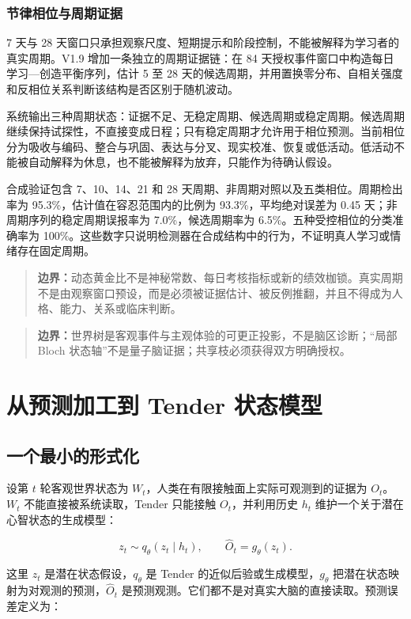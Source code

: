\documentclass[UTF8,a4paper,11pt]{ctexart}
\newcommand{\boundary}[1]{\begin{quote}\noindent\textbf{\color{TenderPink}边界：}#1\end{quote}}
\begin{document}
\subsubsection{节律相位与周期证据}

7 天与 28 天窗口只承担观察尺度、短期提示和阶段控制，不能被解释为学习者的真实周期。V1.9 增加一条独立的周期证据链：在 84 天授权事件窗口中构造每日学习—创造平衡序列，估计 5 至 28 天的候选周期，并用置换零分布、自相关强度和反相位关系判断该结构是否区别于随机波动。

系统输出三种周期状态：证据不足、无稳定周期、候选周期或稳定周期。候选周期继续保持试探性，不直接变成日程；只有稳定周期才允许用于相位预测。当前相位分为吸收与编码、整合与巩固、表达与分叉、现实校准、恢复或低活动。低活动不能被自动解释为休息，也不能被解释为放弃，只能作为待确认假设。

合成验证包含 7、10、14、21 和 28 天周期、非周期对照以及五类相位。周期检出率为 95.3\%，估计值在容忍范围内的比例为 93.3\%，平均绝对误差为 0.45 天；非周期序列的稳定周期误报率为 7.0\%，候选周期率为 6.5\%。五种受控相位的分类准确率为 100\%。这些数字只说明检测器在合成结构中的行为，不证明真人学习或情绪存在固定周期。

\boundary{动态黄金比不是神秘常数、每日考核指标或新的绩效枷锁。真实周期不是由观察窗口预设，而是必须被证据估计、被反例推翻，并且不得成为人格、能力、关系或临床判断。}

\boundary{世界树是客观事件与主观体验的可更正投影，不是脑区诊断；“局部 Bloch 状态轴”不是量子脑证据；共享枝必须获得双方明确授权。}

\section{从预测加工到 Tender 状态模型}

\subsection{一个最小的形式化}

设第 \(t\) 轮客观世界状态为 \(W_t\)，人类在有限接触面上实际可观测到的证据为 \(O_t\)。\(W_t\) 不能直接被系统读取，Tender 只能接触 \(O_t\)，并利用历史 \(h_t\) 维护一个关于潜在心智状态的生成模型：

\begin{equation}
z_t \sim q_\theta(z_t\mid h_t),\qquad
\hat O_t=g_\theta(z_t).
\end{equation}

这里 \(z_t\) 是潜在状态假设，\(q_\theta\) 是 Tender 的近似后验或生成模型，\(g_\theta\) 把潜在状态映射为对观测的预测，\(\hat O_t\) 是预测观测。它们都不是对真实大脑的直接读取。预测误差定义为：
\end{document}
